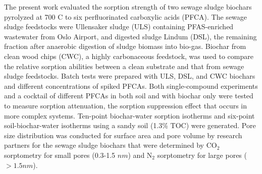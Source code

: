 The present work evaluated the sorption strength of two sewage sludge biochars pyrolyzed at 700 \textdegree C to six perfluorinated carboxylic acids (PFCA). The sewage sludge feedstocks were Ullensaker sludge (ULS) containing PFAS-enriched wastewater from Oslo Airport, and digested sludge Lindum (DSL), the remaining fraction after anaerobic digestion of sludge biomass into bio-gas. Biochar from clean wood chips (CWC), a highly carbonaceous feedstock, was used to compare the relative sorption abilities between a clean substrate and that from sewage sludge feedstocks. Batch tests were prepared with ULS, DSL, and CWC biochars and different concentrations of spiked PFCAs. Both single-compound experiments and a cocktail of different PFCAs in both soil and with biochar only were tested to measure sorption attenuation, the sorption suppression effect that occurs in more complex systems. Ten-point biochar-water sorption isotherms and six-point soil-biochar-water isotherms using a sandy soil (1.3\% TOC) were generated. Pore size distribution was conducted for surface area and pore volume by research partners for the sewage sludge biochars that were determined by $\mathrm{CO_2}$ sorptometry for small pores (0.3-1.5 $nm$) and $\mathrm{N_2}$ sorptometry for large pores ($>1.5 nm$).